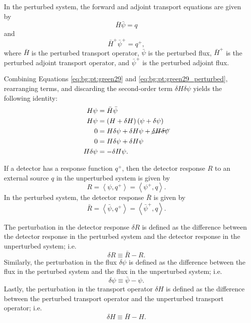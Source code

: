 In the perturbed system, the forward and adjoint transport equations are given by
\begin{equation}\label{eq:bg:pt:green29_perturbed}
  \bar{H}\bar{\psi} = q
\end{equation}
and
\begin{equation}\label{eq:bg:pt:green163_perturbed}
  \bar{H}^+\bar{\psi}^+ = q^+,
\end{equation}
where $\bar{H}$ is the perturbed transport operator, $\bar{\psi}$ is the perturbed flux, $\bar{H}^+$ is the perturbed adjoint transport operator, and $\bar{\psi}^+$ is the perturbed adjoint flux.

Combining Equations \ref{eq:bg:pt:green29} and \ref{eq:bg:pt:green29_perturbed}, rearranging terms, and discarding the second-order term $\delta H\delta\psi$ yields the following identity:
\begin{equation}\label{eq:bg:pt:green44a}\begin{split}
  H\psi       & = \bar{H}\bar{\psi} \\
  H\psi       & = \left(H+\delta H\right)\left(\psi+\delta\psi\right) \\
  0           & = H\delta\psi + \delta H\psi + \cancel{\delta H\delta\psi} \\
  0           & = H\delta\psi + \delta H\psi \\
  H\delta\psi & = -\delta H\psi.
\end{split}\end{equation}

If a detector has a response function $q^+$, then the detector response $R$ to an external source $q$ in the unperturbed system is given by
\begin{equation}\label{eq:bg:pt:green168}
  R = \left<\psi,q^+\right>
    = \left<\psi^+,q\right>.
\end{equation}
In the perturbed system, the detector response $\bar{R}$ is given by
\begin{equation}\label{eq:bg:pt:r_bar}
  \bar{R} = \left<\bar{\psi},q^+\right>
          = \left<\bar{\psi}^+,q\right>.
\end{equation}

The perturbation in the detector response $\delta R$ is defined as the difference between the detector response in the perturbed system and the detector response in the unperturbed system; i.e.
\begin{equation}\label{eq:bg:pt:delta_r}
  \delta R \equiv \bar{R} - R.
\end{equation}
Similarly, the perturbation in the flux $\delta\psi$ is defined as the difference between the flux in the perturbed system and the flux in the unperturbed system; i.e.
\begin{equation}\label{eq:bg:pt:delta_psi}
  \delta \psi \equiv \bar{\psi} - \psi.
\end{equation}
Lastly, the perturbation in the transport operator $\delta H$ is defined as the difference between the perturbed transport operator and the unperturbed transport operator; i.e.
\begin{equation}\label{eq:bg:pt:delta_H}
  \delta H \equiv \bar{H} - H.
\end{equation}

